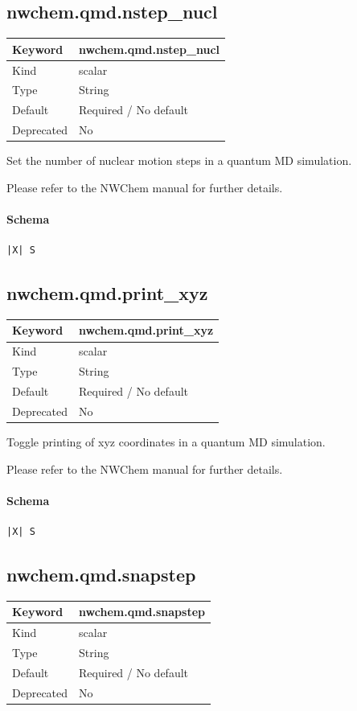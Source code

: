 \documentclass[11pt]{article}
\begin{document}
\subsection{nwchem.qmd.nstep\_nucl}
\label{kw:nwchem-qmd-nstep-nucl}
\begin{longtable}{|p{1.5in}|p{4.5in}|}
\hline
Keyword & nwchem.qmd.nstep\_nucl \\
\hline
Kind & scalar \\
\hline
Type & String \\
\hline
Default & Required / No default \\
\hline
Deprecated & No \\
\hline
\end{longtable}
 Set the number of nuclear motion steps in a quantum MD simulation.

 Please refer to the NWChem manual for further details.

\paragraph{Schema}
\begin{Verbatim}
|X| S
\end{Verbatim}

\subsection{nwchem.qmd.print\_xyz}
\label{kw:nwchem-qmd-print-xyz}
\begin{longtable}{|p{1.5in}|p{4.5in}|}
\hline
Keyword & nwchem.qmd.print\_xyz \\
\hline
Kind & scalar \\
\hline
Type & String \\
\hline
Default & Required / No default \\
\hline
Deprecated & No \\
\hline
\end{longtable}
 Toggle printing of xyz coordinates in a quantum MD simulation.

 Please refer to the NWChem manual for further details.

\paragraph{Schema}
\begin{Verbatim}
|X| S
\end{Verbatim}

\subsection{nwchem.qmd.snapstep}
\label{kw:nwchem-qmd-snapstep}
\begin{longtable}{|p{1.5in}|p{4.5in}|}
\hline
Keyword & nwchem.qmd.snapstep \\
\hline
Kind & scalar \\
\hline
Type & String \\
\hline
Default & Required / No default \\
\hline
Deprecated & No \\
\hline
\end{longtable}
\end{document}
